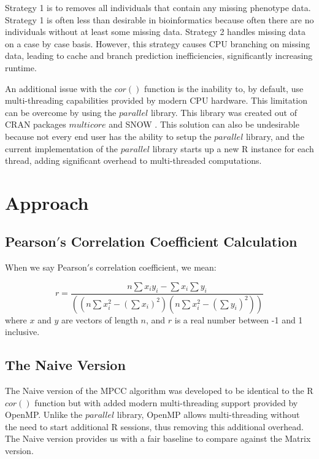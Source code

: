 \documentclass{bioinfo}
\begin{document}
Strategy 1 is to removes all individuals that contain any missing phenotype data.
Strategy 1 is often less than desirable in bioinformatics because often there are no individuals without at least some missing 
data. Strategy 2 handles missing data on a case by case 
basis. However, this strategy causes CPU branching on missing data, leading to 
cache and branch prediction inefficiencies, significantly increasing runtime.

An additional issue with the $cor()$ function is the inability to, by default, use 
multi-threading capabilities provided by modern CPU hardware. This limitation 
can be overcome by using the $parallel$ library. This library was created 
out of CRAN packages $multicore$ \citep{Urbanek2009} and SNOW \citep{Tierney2003}. 
This solution can also be undesirable because not every end user has the ability 
to setup the $parallel$ library, and the current implementation of the $parallel$ library starts up a new R instance 
for each thread, adding significant overhead to multi-threaded computations.

\vspace*{-6pt}

\section{Approach}
\subsection{Pearson$'$s Correlation Coefficient Calculation}
When we say Pearson$'$s correlation coefficient, we mean:

\begin{equation}
r=\frac{n\sum x_iy_i-\sum x_i\sum y_i}{((n\sum x_i^2-(\sum x_i)^2)(n\sum x_i^2-(\sum y_i)^2))}
\end{equation}
where $x$ and $y$ are vectors of length $n$, and $r$ is a real number between -1 and 1 inclusive.

\subsection{The Naive Version}
The Naive version of the MPCC algorithm was developed to be identical 
to the R $cor()$ function but with added modern multi-threading 
support provided by OpenMP. Unlike the $parallel$ library, OpenMP 
allows multi-threading without the need to start additional R 
sessions, thus removing this additional overhead. The Naive version 
provides us with a fair baseline to compare against the Matrix version.
\end{document}
